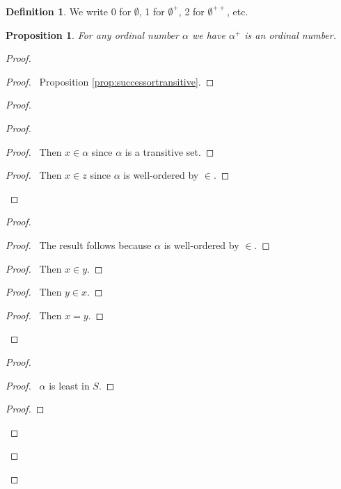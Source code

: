 \documentclass{book}
\let\qed\relax
\newtheorem{prop}[ax]{Proposition}
\theoremstyle{definition}
\newtheorem{df}[ax]{Definition}
\begin{document}
\begin{df}
We write 0 for $\emptyset$, 1 for $\emptyset^+$, 2 for $\emptyset^{++}$, etc.
\end{df}

\begin{prop}
For any ordinal number $\alpha$ we have $\alpha^+$ is an ordinal number.
\end{prop}

\begin{proof}
\pf
{}
\begin{proof}
	\pf\ Proposition \ref{prop:successortransitive}.
\end{proof}
\begin{proof}
	\begin{proof}
		\begin{proof}
			\pf\ Then $x \in \alpha$ since $\alpha$ is a transitive set.
		\end{proof}
		\begin{proof}
			\pf\ Then $x \in z$ since $\alpha$ is well-ordered by $\in$.
		\end{proof}
	\end{proof}
	\begin{proof}
		\begin{proof}
			\pf\ The result follows because $\alpha$ is well-ordered by $\in$.
		\end{proof}
		\begin{proof}
			\pf\ Then $x \in y$.
		\end{proof}
		\begin{proof}
			\pf\ Then $y \in x$.
		\end{proof}
		\begin{proof}
			\pf\ Then $x = y$.
		\end{proof}
	\end{proof}
	\begin{proof}
		\begin{proof}
			\pf\ $\alpha$ is least in $S$.
		\end{proof}
		\begin{proof}
		\end{proof}
	\end{proof}
\end{proof}
\qed
\end{proof}
\end{document}
